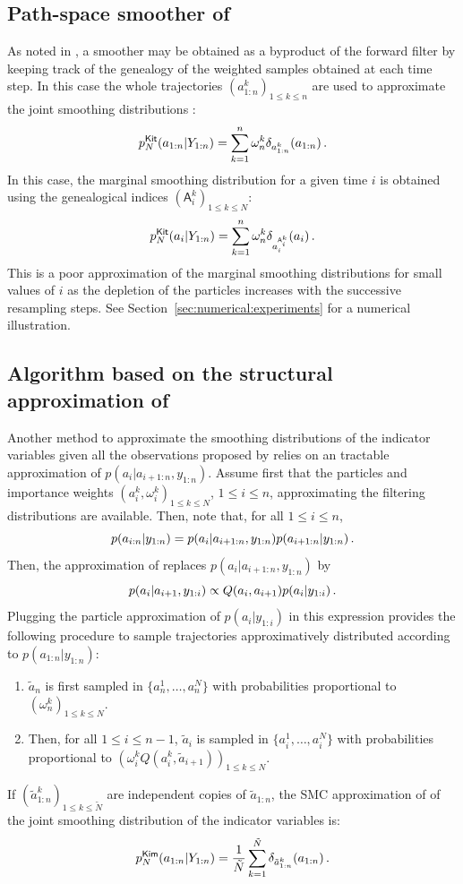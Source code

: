 \subsection{Path-space smoother of \cite{kitagawa:1996}}
As noted in \cite{kitagawa:1996}, a smoother may be obtained as a byproduct of the forward filter by keeping track of the genealogy of the weighted samples obtained at each time step. In this case the whole trajectories $(a^k_{1:n})_{1\le k\le n}$ are used to approximate the joint smoothing distributions :
\[
p^{\mathsf{Kit}}_N(a_{1:n}|Y_{1:n}) = \sum_{k=1}^n \omega^k_{n}\delta_{a^k_{1:n}}(a_{1:n})\,.
\]
In this case, the marginal smoothing distribution for a given time $i$ is obtained using the genealogical indices $(\mathsf{A}^k_i)_{1\le k \le N}$:
\[
p^{\mathsf{Kit}}_N(a_{i}|Y_{1:n}) = \sum_{k=1}^n \omega^k_{n}\delta_{a^{\mathsf{A}^k_i}_{i}}(a_{i})\,.
\]
This is a  poor approximation of the marginal smoothing distributions for small values of $i$ as the depletion of the particles increases with the successive resampling steps. See Section~\ref{sec:numerical:experiments} for a numerical illustration.


\subsection{Algorithm based on the structural approximation of \cite{kim:1994}}
Another method to approximate the smoothing distributions of the indicator variables given all the observations proposed by \cite{kim:1994} relies on an tractable approximation of $p(a_i|a_{i+1:n},y_{1:n})$. Assume first that the particles and importance weights $(a_i^k,\omega_i^k)_{1\le k \le N}$, $1\le i\le n$, approximating the filtering distributions are available. Then, note that, for all $1\le i\le n$,
\[
p(a_{i:n}|y_{1:n}) = p(a_{i}|a_{i+1:n},y_{1:n})p(a_{i+1:n}|y_{1:n})\,.
\]
Then, the approximation of \cite{kim:1994} replaces $p(a_i|a_{i+1:n},y_{1:n})$ by
\[
p(a_i|a_{i+1},y_{1:i}) \propto Q(a_i,a_{i+1})p(a_i|y_{1:i})\,.
\]
Plugging the particle approximation of $p(a_i|y_{1:i})$ in this expression provides the following procedure to sample trajectories approximatively distributed according to $p(a_{1:n}|y_{1:n})$:
\begin{enumerate}[-]
\item $\tilde{a}_{n}$ is first sampled in $\{a_n^1,\ldots,a_n^N\}$ with probabilities proportional to $(\omega_n^k)_{1\le k \le N}$. 
\item Then, for all $1\le i \le n-1$, $\tilde{a}_{i}$ is sampled in $\{a_i^1,\ldots,a_i^N\}$ with probabilities proportional to $(\omega_i^kQ(a_i^k,\tilde{a}_{i+1}))_{1\le k \le N}$. 
\end{enumerate}
If $(\tilde{a}^k_{1:n})_{1\le k \le \tilde{N}}$ are independent copies of $\tilde{a}_{1:n}$, the SMC approximation of \cite{kim:1994} of the joint smoothing distribution of the indicator variables is:
\[
p^{\mathsf{Kim}}_N(a_{1:n}|Y_{1:n}) = \frac{1}{\tilde{N}}\sum_{k=1}^{\tilde N} \delta_{\tilde{a}^{k}_{1:n}}(a_{1:n})\,.
\]

